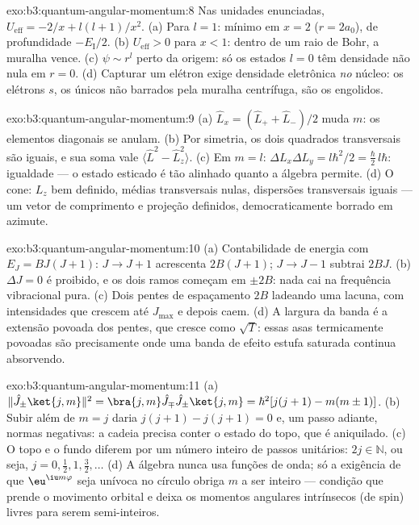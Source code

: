 \begin{solution}{exo:b3:quantum-angular-momentum:8}
Nas unidades enunciadas, $U_{\text{eff}} = -2/x + l(l+1)/x^2$. (a) Para
$l = 1$: mínimo em $x = 2$ ($r = 2a_0$), de profundidade
$-E_{\text{I}}/2$. (b) $U_{\text{eff}} > 0$ para $x < 1$: dentro de um
raio de Bohr, a muralha vence. (c) $\psi \sim r^l$ perto da origem: só
os estados $l = 0$ têm densidade não nula em $r = 0$. (d) Capturar um
elétron exige densidade eletrônica \emph{no} núcleo: os elétrons $s$,
os únicos não barrados pela muralha centrífuga, são os engolidos.
\end{solution}

\begin{solution}{exo:b3:quantum-angular-momentum:9}
(a) $\hat L_x = (\hat L_+ + \hat L_-)/2$ muda $m$: os elementos
diagonais se anulam. (b) Por simetria, os dois quadrados transversais
são iguais, e sua soma vale $\langle\hat L^2 - \hat L_z^2\rangle$. (c)
Em $m = l$: $\Delta L_x\Delta L_y = l\hbar^2/2 = \tfrac\hbar2
\,l\hbar$: igualdade --- o estado esticado é tão alinhado quanto a
álgebra permite. (d) O cone: $L_z$ bem definido, médias transversais
nulas, dispersões transversais iguais --- um vetor de comprimento e
projeção definidos, democraticamente borrado em azimute.
\end{solution}

\begin{solution}{exo:b3:quantum-angular-momentum:10}
(a) Contabilidade de energia com $E_J = BJ(J+1)$: $J \to J + 1$
acrescenta $2B(J+1)$; $J \to J - 1$ subtrai $2BJ$. (b) $\Delta J = 0$ é
proibido, e os dois ramos começam em $\pm 2B$: nada cai na frequência
vibracional pura. (c) Dois pentes de espaçamento $2B$ ladeando uma
lacuna, com intensidades que crescem até $J_{\max}$ e depois caem. (d)
A largura da banda é a extensão povoada dos pentes, que cresce como
$\sqrt{T}$: essas asas termicamente povoadas são precisamente onde uma
banda de efeito estufa saturada continua absorvendo.
\end{solution}

\begin{solution}{exo:b3:quantum-angular-momentum:11}
(a) $\|\hat J_\pm\ket{j,m}\|^2 = \bra{j,m}\hat J_\mp\hat J_\pm
\ket{j,m} = \hbar^2[j(j+1) - m(m\pm1)]$. (b) Subir além de $m = j$
daria $j(j+1) - j(j+1) = 0$ e, um passo adiante, normas negativas: a
cadeia precisa conter o estado do topo, que é aniquilado. (c) O topo e
o fundo diferem por um número inteiro de passos unitários: $2j \in
\mathbb N$, ou seja, $j = 0, \tfrac12, 1, \tfrac32, \dots$ (d) A
álgebra nunca usa funções de onda; só a exigência de que
$\eu^{\iu m\varphi}$ seja unívoca no círculo obriga $m$ a ser inteiro
--- condição que prende o movimento orbital e deixa os momentos
angulares intrínsecos (de spin) livres para serem semi-inteiros.
\end{solution}

